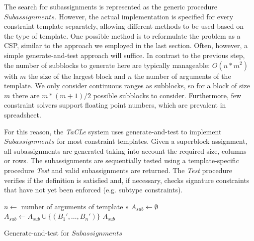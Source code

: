 \documentclass{IEEEtran}
\newcommand{\format}[1]{\textit{#1}\xspace}
\newcommand{\findassignment}{\format{Subassignments}}
\newcommand{\sname}{\format{TaCLe}}
\theoremstyle{definition}
\begin{document}
The search for subassignments is represented as the generic procedure $\findassignment$.
However, the actual implementation is specified for every constraint template separately, allowing different methods to be used based on the type of template.
One possible method is to reformulate the problem as a CSP, similar to the approach we employed in the last section.
Often, however, a simple generate-and-test approach will suffice.
In contrast to the previous step, the number of subblocks to generate here are typically manageable: $O(n*m^2)$ with $m$ the size of the largest block and $n$ the number of arguments of the template.
We only consider continuous ranges as subblocks, so for a block of size $m$ there are $m*(m+1)/2$ possible subblocks to consider.
Furthermore, few constraint solvers support floating point numbers, which are prevalent in spreadsheet.

For this reason, the \sname system uses generate-and-test to implement $\findassignment$ for most constraint templates.
Given a superblock assignment, all subassignments are generated taking into account the required size, columns or rows.
The subassignments are sequentially tested using a template-specific procedure \textit{Test} and valid subassignments are returned.
The \textit{Test} procedure verifies if the definition is satisfied and, if necessary, checks signature constraints that have not yet been enforced (e.g. subtype constraints).

\begin{algorithm}[tbh]
  \begin{algorithmic}
    \footnotesize
    \State $n \gets$ number of arguments of template $s$
    \State $A_{sub} \gets \emptyset$
        \State $A_{sub} \gets A_{sub} \cup \{ (B_1', \dots, B_n') \}$
      \EndIf
    \EndFor
\Return $A_{sub}$
\EndProcedure
\end{algorithmic}
\caption{Generate-and-test for $\findassignment$}
\label{algo:gen-test-subblocks}
\end{algorithm}



\end{document}
